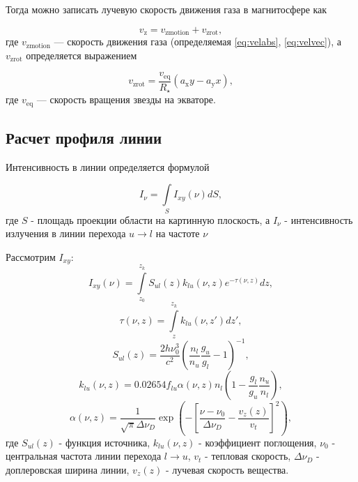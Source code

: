 \documentclass[12pt]{article}
\begin{document}
Тогда можно записать лучевую скорость движения газа в магнитосфере как

\begin{equation} \label{eq:vz}
v_\text{z} = v_\text{zmotion} + v_\text{zrot}, 
\end{equation}
где $v_\text{zmotion}$ --- скорость движения газа (определяемая \eqref{eq:velabs}, \eqref{eq:velvec}), а $v_\text{zrot}$ определяется выражением

\begin{equation} \label{eq:vzrot}
v_\text{zrot} = \frac{v_\text{eq}}{R_\star}(a_\text{x}y - a_\text{y}x),
\end{equation}
где $v_\text{eq}$ --- скорость вращения звезды на экваторе.

\subsection{Расчет профиля линии}


Интенсивность в линии определяется формулой

\begin{equation} \label{eq:profmain}
I_{\nu} = \int \limits_{S} I_{xy}(\nu) dS,
\end{equation}
где $S$ - площадь проекции области на картинную плоскость, а $I_\nu$ - интенсивность излучения в линии перехода $u \rightarrow l$ на частоте $\nu$ 

Рассмотрим $I_{xy}$:
\begin{equation} \label{eq:profproj}
I_{xy}(\nu) = \int \limits_{z_0}^{z_k} S_{ul}(z)k_{lu}(\nu,z)e^{-\tau(\nu,z)}dz,
\end{equation}
\begin{equation} \label{eq:profdepth}
\tau(\nu,z) = \int \limits_z^{z_k} k_{lu}(\nu,z')dz',
\end{equation}
\begin{equation} \label{eq:profsource}
S_{ul}(z) = \frac{2h\nu_0^3}{c^2}\left(\frac{n_l}{n_u} \frac{g_u}{g_l} - 1 \right)^{-1},
\end{equation}
\begin{equation} \label{eq:profabsorb}
k_{lu}(\nu,z) = 0.02654f_{lu}\alpha(\nu, z)n_l\left(1 - \frac{g_l}{g_u}\frac{n_u}{n_l}\right),
\end{equation}
\begin{equation} \label{eq:profabsprof}
\alpha(\nu, z) = \frac{1}{\sqrt{\pi} \Delta\nu_D} \exp\left( -\left[ \frac{\nu - \nu_0}{\Delta\nu_D} - \frac{v_z(z)}{v_t}\right]^2\right),
\end{equation}
где $S_{ul}(z)$ - функция источника, $k_{lu}(\nu, z)$ - коэффициент поглощения, $\nu_0$ - центральная частота линии перехода $l \rightarrow u$, $v_t$ - тепловая скорость, $\Delta\nu_D$ - доплеровская ширина линии, $v_z(z)$ - лучевая скорость вещества.
\end{document}
